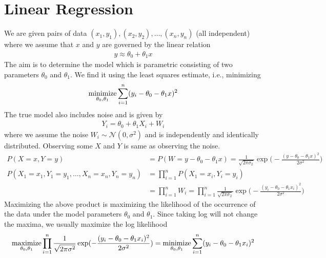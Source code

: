 \documentclass[../probability-notes.tex]{subfiles}
\begin{document}
    \section{Linear Regression}
    We are given pairs of data $(x_{1},y_{1}), (x_{2},y_{2}), \ldots, (x_{n},y_{n})$ (all independent) where we assume that $x$ and $y$ are governed by the linear relation
    \begin{align*}
        y \approx \theta_{0} + \theta_{1}x
    \end{align*}
    The aim is to determine the model which is parametric consisting of two parameters $\theta_{0}$ and $\theta_{1}$. We find it using the least squares estimate, i.e., minimizing
    \begin{align*}
        \operatorname*{minimize}_{\theta_{0}, \theta_{1}} \sum_{i=1}^{n} (y_{i} - \theta_{0} - \theta_{1}x)^{2}
    \end{align*}
    The true model also includes noise and is given by
    \begin{align*}
        Y_{i} = \theta_{0} + \theta_{1}X_{i} + W_{i}
    \end{align*}
    where we assume the noise $W_{i} \sim \mathcal{N}(0, \sigma^{2})$ and is independently and identically distributed. Observing some $X$ and $Y$ is same as observing the noise.
    \begin{align*}
        P(X=x,Y=y) &= P(W=y-\theta_{0}-\theta_{1}x) = \frac{1}{\sqrt{2\pi \sigma_{2}}} \exp\bigg(-\frac{(y-\theta_{0}-\theta_{1}x)^{2}}{2 \sigma^{2}}\bigg)\\
        P(X_{1}=x_{1},Y_{1}=y_{1}, \ldots, X_{n}=x_{n},Y_{n}=y_{n}) &= \prod_{i=1}^{n} P(X_{1}=x_{i},Y_{i}=y_{i})\\
        &= \prod_{i=1}^{n} W_{i} = \prod_{i=1}^{n} \frac{1}{\sqrt{2\pi\sigma_{2}}} \exp\bigg(-\frac{(y_{i}-\theta_{0}-\theta_{1}x_{i})^{2}}{2\sigma^{2}}\bigg)
    \end{align*}
    Maximizing the above product is maximizing the likelihood of the occurrence of the data under the model parameters $\theta_{0}$ and $\theta_{1}$. Since taking log will not change the maxima, we usually maximize the log likelihood
    \begin{align*}
        \operatorname*{maximize}_{\theta_{0}, \theta_{1}} \prod_{i=1}^{n} \frac{1}{\sqrt{2\pi\sigma^{2}}} \exp(-\frac{(y_{i}-\theta_{0}-\theta_{1}x_{i})^{2}}{2\sigma^{2}}) = \operatorname*{minimize}_{\theta_{0}, \theta_{1}} \sum_{i=1}^{n} (y_{i}-\theta_{0}-\theta_{1}x_{i})^{2}
    \end{align*}
\end{document}
